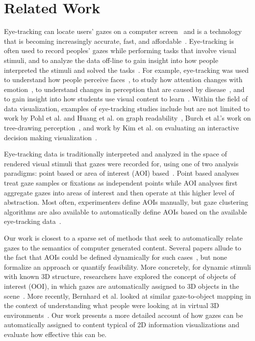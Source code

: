 \section{Related Work}
Eye-tracking can locate users' gazes on a computer screen~\cite{ware1987evaluation, jacob1991use} and is a technology that is becoming increasingly accurate, fast, and affordable~\cite{duchowski2007eye, sesma2012evaluation}. Eye-tracking is often used to record peoples' gazes while performing tasks that involve visual stimuli, and to analyze the data off-line to gain insight into how people interpreted the stimuli and solved the tasks~\cite{duchowski2007eye}. For example, eye-tracking was used to understand how people perceive faces~\cite{guo2014perceiving,shasteen2014eye}, to study how attention changes with emotion~\cite{vervoort2013attentional}, to understand changes in perception that are caused by disease~\cite{kim2014investigating}, and to gain insight into how students use visual content to learn~\cite{zawoyski2014using,mayer2010unique,van2010eye,conati2013eye}. Within the field of data visualization, examples of eye-tracking studies include but are not limited to work by Pohl et al. and Huang et al. on graph readability~\cite{pohl2009comparing,huang2008beyond,huang2005people}, Burch et al.'s work on tree-drawing perception~\cite{burch2011evaluation,burch2013visual}, and work by Kim et al. on evaluating an interactive decision making visualization~\cite{kim2012does}.
 
Eye-tracking data is traditionally interpreted and analyzed in the space of rendered visual stimuli that gazes were recorded for, using one of two analysis paradigms: point based or area of interest (AOI) based~\cite{blascheckstate}. Point based analyses treat gaze samples or fixations as independent points while AOI analyses first aggregate gazes into areas of interest and then operate at this higher level of abstraction. Most often, experimenters define AOIs manually, but gaze clustering algorithms are also available to automatically define AOIs based on the available eye-tracking data~\cite{privitera2000algorithms,santella2004robust,drusch2014analysing}. 

Our work is closest to a sparse set of methods that seek to automatically relate gazes to the semantics of computer generated content. Several papers allude to the fact that AOIs could be defined dynamically for such cases~\cite{steichen2013user,kurzhals2014iseecube}, but none formalize an  approach or quantify feasibility. More concretely, for dynamic stimuli with known 3D structure, researchers have explored the concept of objects of interest (OOI), in which gazes are automatically assigned to 3D objects in the scene~\cite{stellmach20103d}. More recently, Bernhard et al. looked at similar gaze-to-object mapping in the context of understanding what people were looking at in virtual 3D environments~\cite{bernhard2014gaze}. Our work presents a more detailed account of how gazes can be automatically assigned to content typical of 2D information visualizations and evaluate how effective this can be.
 
